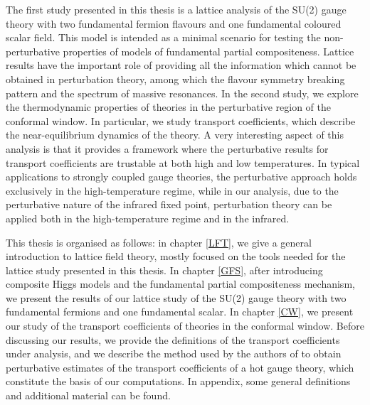 The first study presented in this thesis is a lattice analysis of the SU(2) gauge theory with two fundamental fermion flavours and one fundamental coloured scalar field. This model is intended as a minimal scenario for testing the non-perturbative properties of models of  fundamental partial compositeness. 
Lattice results have the important role of providing all the information which cannot be obtained in perturbation theory, among which the flavour symmetry breaking pattern and the spectrum of massive resonances.
In the second study, we explore the thermodynamic properties of theories in the perturbative region of the conformal window. In particular, we study transport coefficients, which describe the near-equilibrium dynamics of the theory.
A very interesting aspect of this analysis is that it provides a framework where the perturbative results for transport coefficients are trustable at both high and low temperatures. In typical applications to strongly coupled gauge theories, the perturbative approach holds exclusively in the high-temperature regime, while in our analysis, due to the perturbative nature of the infrared fixed point, perturbation theory can be applied both in the high-temperature regime and in the infrared.


This thesis is organised as follows: in chapter \ref{LFT}, we give a general introduction to lattice field theory, mostly focused on the tools needed for the lattice study presented in this thesis. In chapter \ref{GFS}, after introducing composite Higgs models and the fundamental partial compositeness mechanism, we present the results of our lattice study of the SU(2) gauge theory with two fundamental fermions and one fundamental scalar. In chapter \ref{CW}, we present our study of the transport coefficients of theories in the conformal window. Before discussing our results, we provide the definitions of the transport coefficients under analysis, and we describe the method used by the authors of \cite{Arnold:2000dr} to obtain perturbative estimates of the transport coefficients of a hot gauge theory, which constitute the basis of our computations.
In appendix, some general definitions and additional material can be found.